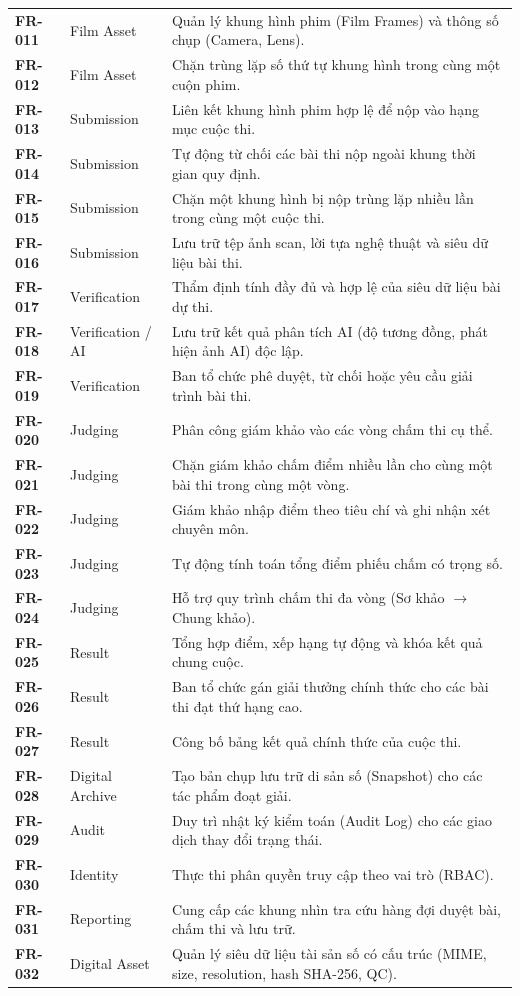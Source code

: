 \begin{table}[!ht]
\begin{tabularx}{\textwidth}{p{1.8cm}p{3.2cm}>{\raggedright\arraybackslash}X}
\textbf{FR-011} & Film Asset & Quản lý khung hình phim (Film Frames) và thông số chụp (Camera, Lens). \\
\textbf{FR-012} & Film Asset & Chặn trùng lặp số thứ tự khung hình trong cùng một cuộn phim. \\
\textbf{FR-013} & Submission & Liên kết khung hình phim hợp lệ để nộp vào hạng mục cuộc thi. \\
\textbf{FR-014} & Submission & Tự động từ chối các bài thi nộp ngoài khung thời gian quy định. \\
\textbf{FR-015} & Submission & Chặn một khung hình bị nộp trùng lặp nhiều lần trong cùng một cuộc thi. \\
\textbf{FR-016} & Submission & Lưu trữ tệp ảnh scan, lời tựa nghệ thuật và siêu dữ liệu bài thi. \\
\textbf{FR-017} & Verification & Thẩm định tính đầy đủ và hợp lệ của siêu dữ liệu bài dự thi. \\
\textbf{FR-018} & Verification / AI & Lưu trữ kết quả phân tích AI (độ tương đồng, phát hiện ảnh AI) độc lập. \\
\textbf{FR-019} & Verification & Ban tổ chức phê duyệt, từ chối hoặc yêu cầu giải trình bài thi. \\
\textbf{FR-020} & Judging & Phân công giám khảo vào các vòng chấm thi cụ thể. \\
\textbf{FR-021} & Judging & Chặn giám khảo chấm điểm nhiều lần cho cùng một bài thi trong cùng một vòng. \\
\textbf{FR-022} & Judging & Giám khảo nhập điểm theo tiêu chí và ghi nhận xét chuyên môn. \\
\textbf{FR-023} & Judging & Tự động tính toán tổng điểm phiếu chấm có trọng số. \\
\textbf{FR-024} & Judging & Hỗ trợ quy trình chấm thi đa vòng (Sơ khảo $\rightarrow$ Chung khảo). \\
\textbf{FR-025} & Result & Tổng hợp điểm, xếp hạng tự động và khóa kết quả chung cuộc. \\
\textbf{FR-026} & Result & Ban tổ chức gán giải thưởng chính thức cho các bài thi đạt thứ hạng cao. \\
\textbf{FR-027} & Result & Công bố bảng kết quả chính thức của cuộc thi. \\
\textbf{FR-028} & Digital Archive & Tạo bản chụp lưu trữ di sản số (Snapshot) cho các tác phẩm đoạt giải. \\
\textbf{FR-029} & Audit & Duy trì nhật ký kiểm toán (Audit Log) cho các giao dịch thay đổi trạng thái. \\
\textbf{FR-030} & Identity & Thực thi phân quyền truy cập theo vai trò (RBAC). \\
\textbf{FR-031} & Reporting & Cung cấp các khung nhìn tra cứu hàng đợi duyệt bài, chấm thi và lưu trữ. \\
\textbf{FR-032} & Digital Asset & Quản lý siêu dữ liệu tài sản số có cấu trúc (MIME, size, resolution, hash SHA-256, QC). \\
\bottomrule
\end{tabularx}
\end{table}

